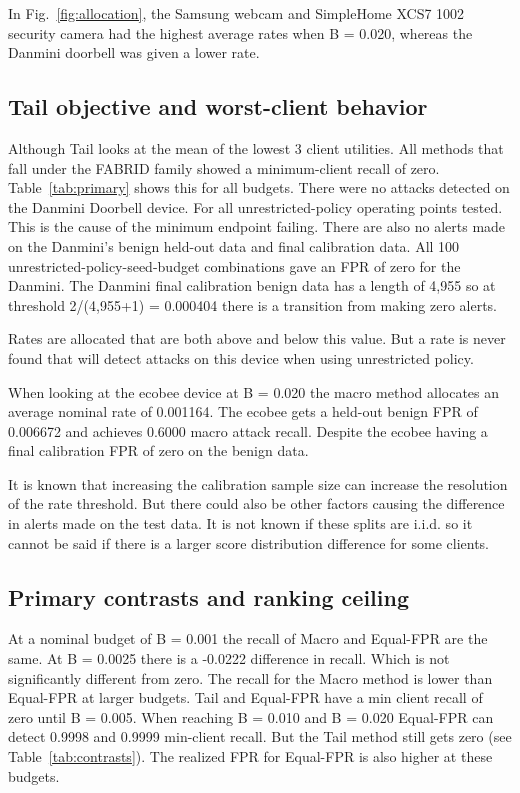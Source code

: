 \documentclass[pdflatex,sn-mathphys-num]{sn-jnl}
\begin{document}
In Fig.~\ref{fig:allocation}, the Samsung webcam and SimpleHome XCS7 1002 security camera had the highest average rates when B = 0.020, whereas the Danmini doorbell was given a lower rate.

\subsection{Tail objective and worst-client behavior}
Although Tail looks at the mean of the lowest 3 client utilities. All methods that fall under the FABRID family showed a minimum-client recall of zero. Table~\ref{tab:primary} shows this for all budgets. There were no attacks detected on the Danmini Doorbell device. For all unrestricted-policy operating points tested. This is the cause of the minimum endpoint failing. There are also no alerts made on the Danmini's benign held-out data and final calibration data. All 100 unrestricted-policy-seed-budget combinations gave an FPR of zero for the Danmini. The Danmini final calibration benign data has a length of 4,955 so at threshold 2/(4,955+1) = 0.000404 there is a transition from making zero alerts.

Rates are allocated that are both above and below this value. But a rate is never found that will detect attacks on this device when using unrestricted policy.

When looking at the ecobee device at B = 0.020 the macro method allocates an average nominal rate of 0.001164. The ecobee gets a held-out benign FPR of 0.006672 and achieves 0.6000 macro attack recall. Despite the ecobee having a final calibration FPR of zero on the benign data.

It is known that increasing the calibration sample size can increase the resolution of the rate threshold. But there could also be other factors causing the difference in alerts made on the test data. It is not known if these splits are i.i.d. so it cannot be said if there is a larger score distribution difference for some clients.

\subsection{Primary contrasts and ranking ceiling}
At a nominal budget of B = 0.001 the recall of Macro and Equal-FPR are the same. At B = 0.0025 there is a -0.0222 difference in recall. Which is not significantly different from zero. The recall for the Macro method is lower than Equal-FPR at larger budgets. Tail and Equal-FPR have a min client recall of zero until B = 0.005. When reaching B = 0.010 and B = 0.020 Equal-FPR can detect 0.9998 and 0.9999 min-client recall. But the Tail method still gets zero (see Table~\ref{tab:contrasts}). The realized FPR for Equal-FPR is also higher at these budgets.
\end{document}
